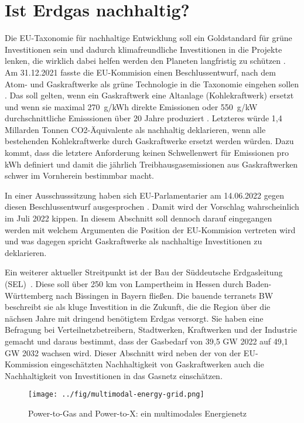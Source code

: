 
\section{Ist Erdgas nachhaltig?}

Die EU-Taxonomie für nachhaltige Entwicklung soll ein Goldstandard für grüne Investitionen sein und dadurch klimafreundliche Investitionen in die Projekte lenken, die wirklich dabei helfen werden den Planeten langfristig zu schützen \cite{reuters}. Am 31.12.2021 fasste die EU-Kommision einen Beschlussentwurf, nach dem Atom- und Gaskraftwerke als grüne Technologie in die Taxonomie eingehen sollen \cite{taz-taxonomie}. Das soll gelten, wenn ein Gaskraftwerk eine Altanlage (Kohlekraftwerk) ersetzt \cite{eu-komm} und wenn sie maximal 270~g/kWh direkte Emissionen oder 550~g/kW durchschnittliche Emisssionen über 20 Jahre produziert \cite{uba}. Letzteres würde 1,4 Millarden Tonnen CO2-Äquivalente als nachhaltig deklarieren, wenn alle bestehenden Kohlekraftwerke durch Gaskraftwerke ersetzt werden würden. Dazu kommt, dass die letztere Anforderung keinen Schwellenwert für Emissionen pro kWh definiert und damit die jährlich Treibhausgasemissionen aus Gaskraftwerken schwer im Vornherein bestimmbar macht.

In einer Ausschusssitzung haben sich EU-Parlamentarier am 14.06.2022 gegen diesen Beschlussentwurf ausgesprochen \cite{spiegel-taxonomie}. Damit wird der Vorschlag wahrscheinlich im Juli 2022 kippen. In diesem Abschnitt soll dennoch darauf eingegangen werden mit welchem Argumenten die Position der EU-Kommision vertreten wird und was dagegen spricht Gaskraftwerke als nachhaltige Investitionen zu deklarieren. 

Ein weiterer aktueller Streitpunkt ist der Bau der Süddeutsche Erdgasleitung (SEL)~\cite{terranets}. Diese soll über 250 km von Lampertheim in Hessen durch Baden-Württemberg nach Bissingen in Bayern fließen. Die bauende terranets BW beschreibt sie als kluge Investition in die Zukunft, die die Region über die nächsen Jahre mit dringend benötigtem Erdgas versorgt. Sie haben eine Befragung bei Verteilnetzbetreibern, Stadtwerken, Kraftwerken und der Industrie gemacht und daraus bestimmt, dass der Gasbedarf von 39,5 GW 2022 auf 49,1 GW 2032 wachsen wird.
Dieser Abschnitt wird neben der von der EU-Kommission eingeschätzten Nachhaltigkeit von Gaskraftwerken auch die Nachhaltigkeit von Investitionen in das Gasnetz einschätzen.

\begin{figure}[h]
\centering
\texttt{[image: ../fig/multimodal-energy-grid.png]}
\caption{Power-to-Gas and Power-to-X: ein multimodales Energienetz \cite{multimodal-grids}}
\label{fig:multimodal-grids}
\end{figure}

